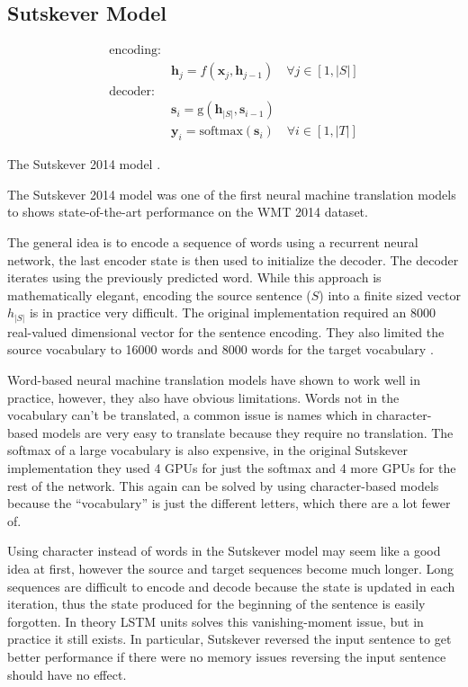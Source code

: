 \subsection{Sutskever Model}

\begin{equationbox}[H]
\begin{equation*}
\begin{aligned}
\text{encoding:} & \\
& \mathbf{h}_j = f(\mathbf{x}_j, \mathbf{h}_{j-1}) \quad \forall j \in [1, |S|] \\
\text{decoder:} & \\
&\mathbf{s}_i = \mathrm{g}(\mathbf{h}_{|S|}, \mathbf{s}_{i-1}) \\
&\mathbf{y}_i = \mathrm{softmax}(\mathbf{s}_i) \quad \forall i \in [1, |T|]
\end{aligned}
\end{equation*}
\caption{The Sutskever 2014 model \cite{sutskever-2014-nmt}.}
\end{equationbox}

The Sutskever 2014 model \cite{sutskever-2014-nmt} was one of the first neural machine translation models to shows state-of-the-art performance on the WMT 2014 dataset.

The general idea is to encode a sequence of words using a recurrent neural network, the last encoder state is then used to initialize the decoder. The decoder iterates using the previously predicted word. While this approach is mathematically elegant, encoding the source sentence ($S$) into a finite sized vector $h_{|S|}$ is in practice very difficult. The original implementation required an 8000 real-valued dimensional vector for the sentence encoding. They also limited the source vocabulary to 16000 words and 8000 words for the target vocabulary \cite{sutskever-2014-nmt}.

Word-based neural machine translation models have shown to work well in practice, however, they also have obvious limitations. Words not in the vocabulary can't be translated, a common issue is names which in character-based models are very easy to translate because they require no translation. The softmax of a large vocabulary is also expensive, in the original Sutskever implementation they used 4 GPUs for just the softmax and 4 more GPUs for the rest of the network. This again can be solved by using character-based models because the ``vocabulary'' is just the different letters, which there are a lot fewer of.

Using character instead of words in the Sutskever model may seem like a good idea at first, however the source and target sequences become much longer. Long sequences are difficult to encode and decode because the state is updated in each iteration, thus the state produced for the beginning of the sentence is easily forgotten. In theory LSTM units solves this vanishing-moment issue, but in practice it still exists. In particular, Sutskever reversed the input sentence to get better performance if there were no memory issues reversing the input sentence should have no effect.

